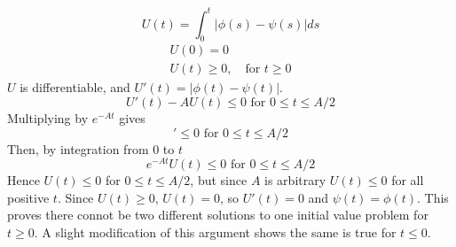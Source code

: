 \begin{enumerate}
            \begin{equation*}
                U(t) = \int_0^t |\phi(s) - \psi(s)| ds
            \end{equation*}
            \begin{align*}
                U(0) = 0 \\
                U(t) \geq 0, \quad \text{for } t \geq 0
            \end{align*}
            $U$ is differentiable, and $U'(t) = |\phi(t) - \psi(t)|$.
            \begin{equation*}
                U'(t) - AU(t) \leq 0 \text{ for } 0 \leq t \leq A/2
            \end{equation*}
            Multiplying by $e^{-At}$ gives
            \begin{equation*}
                [e^{-At}U(t)]' \leq 0  \text{ for } 0 \leq t \leq A/2
            \end{equation*}
            Then, by integration from 0 to $t$
            \begin{equation*}
                e^{-At}U(t) \leq 0  \text{ for } 0 \leq t \leq A/2
            \end{equation*}
            Hence $U(t) \leq 0$ for $0 \leq t \leq A/2$, but since $A$ is arbitrary $U(t) \leq 0$ for all positive $t$. Since $U(t) \geq 0$, $U(t) = 0$, so $U'(t) = 0$ and $\psi(t)= \phi(t)$. This proves there connot be two different solutions to one initial value problem for $t \geq 0$. A slight modification of this argument shows the same is true for $t \leq 0$.
    \end{enumerate}